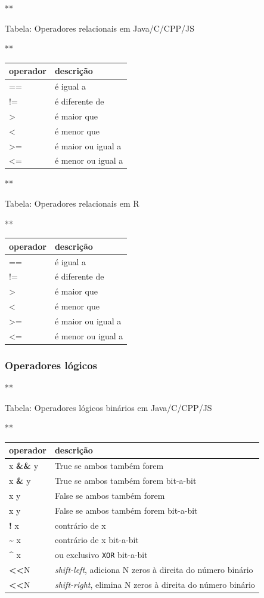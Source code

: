 \documentclass[12pt,a4paper]{article}
\begin{document}
    **

Tabela: Operadores relacionais em Java/C/CPP/JS

**

\begin{longtable}[]{@{}ll@{}}
\toprule
operador & descrição\tabularnewline
\midrule
\endhead
== & é igual a\tabularnewline
!= & é diferente de\tabularnewline
\textgreater{} & é maior que\tabularnewline
\textless{} & é menor que\tabularnewline
\textgreater{}= & é maior ou igual a\tabularnewline
\textless{}= & é menor ou igual a\tabularnewline
\bottomrule
\end{longtable}

    **

Tabela: Operadores relacionais em R

**

\begin{longtable}[]{@{}ll@{}}
\toprule
operador & descrição\tabularnewline
\midrule
\endhead
== & é igual a\tabularnewline
!= & é diferente de\tabularnewline
\textgreater{} & é maior que\tabularnewline
\textless{} & é menor que\tabularnewline
\textgreater{}= & é maior ou igual a\tabularnewline
\textless{}= & é menor ou igual a\tabularnewline
\bottomrule
\end{longtable}

    \hypertarget{operadores-luxf3gicos}{%
\subsubsection{Operadores lógicos}\label{operadores-luxf3gicos}}

    **

Tabela: Operadores lógicos binários em Java/C/CPP/JS

**

\begin{longtable}[]{@{}ll@{}}
\toprule
operador & descrição\tabularnewline
\midrule
\endhead
x \textbf{\&\&} y & True se ambos também forem\tabularnewline
x \textbf{\&} y & True se ambos também forem bit-a-bit\tabularnewline
x \textbf{\textbar{}\textbar{}} y & False se ambos também
forem\tabularnewline
x \textbf{\textbar{}} y & False se ambos também forem
bit-a-bit\tabularnewline
\textbf{!} x & contrário de x\tabularnewline
\textbf{\textasciitilde{}} x & contrário de x bit-a-bit\tabularnewline
\textbf{\^{}} x & ou exclusivo \texttt{XOR} bit-a-bit\tabularnewline
\textbf{\textless{}\textless{}}N & \emph{shift-left}, adiciona N zeros à
direita do número binário\tabularnewline
\textbf{\textless{}\textless{}}N & \emph{shift-right}, elimina N zeros à
direita do número binário\tabularnewline
\bottomrule
\end{longtable}
\end{document}
